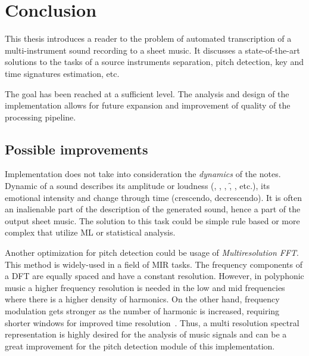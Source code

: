 \chapter{Conclusion}\label{ch:conclusion}

This thesis introduces a reader to the problem of automated transcription of a multi-instrument sound recording to
a sheet music. It discusses a state-of-the-art solutions to the tasks of a source instruments separation, pitch
detection, key and time signatures estimation, etc.

The goal has been reached at a sufficient level. The analysis and design of the implementation allows for future
expansion and improvement of quality of the processing pipeline.

\section{Possible improvements}\label{sec:possible-improvements}

Implementation does not take into consideration the \textit{dynamics} of the notes. Dynamic of a sound describes its
amplitude or loudness (\pp, \p, \mf, \f, \ff, etc.), its emotional intensity and change through time (crescendo,
decrescendo). It is often an inalienable part of the description of the generated sound, hence a part of the output
sheet music. The solution to this task could be simple rule based or more complex that utilize \ac{ML} or statistical
analysis.

Another optimization for pitch detection could be usage of \textit{Multiresolution \ac{FFT}}. This method is widely-used
in a field of \ac{MIR} tasks. The frequency components of a \ac{DFT} are equally spaced and have a constant resolution.
However, in polyphonic music a higher frequency resolution is needed in the low and mid frequencies where there is
a higher density of harmonics. On the other hand, frequency modulation gets stronger as the number of harmonic is
increased, requiring shorter windows for improved time resolution~\cite{cancela2009efficient}. Thus, a multi resolution
spectral representation is highly desired for the analysis of music signals and can be a great improvement for the pitch
detection module of this implementation.